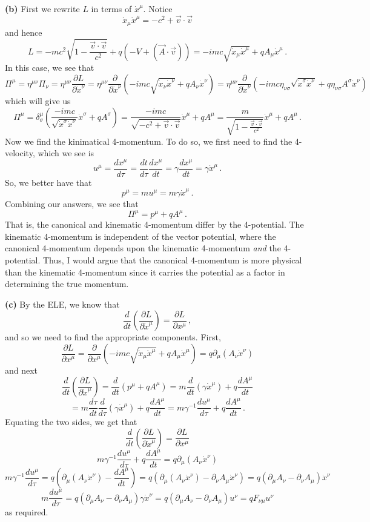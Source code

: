 \documentclass[10pt]{article}
\newcommand{\di}[2][]{\frac{\partial #1}{\partial #2}}
\newcommand{\del}[2][]{\frac{d #1}{d #2}}
\begin{document}
\textbf{(b)} First we rewrite $L$ in terms of $\dot{x}^{\mu}$. Notice
\[ \dot{x}_{\mu}\dot{x}^{\mu} = -c^{2} + \vec{v}\cdot\vec{v} \]
and hence
\[ L = -mc^{2}\sqrt{1 - \frac{\vec{v}\cdot\vec{v}}{c^{2}}} + q(-V + (\vec{A}\cdot\vec{v})) = -imc\sqrt{\dot{x}_{\mu}\dot{x}^{\mu}} + qA_{\mu}\dot{x}^{\mu}\, .\]
In this case, we see that
\[ \Pi^{\mu} = \eta^{\mu\nu}\Pi_{\nu} = \eta^{\mu\nu}\di[L]{\dot{x}^{\nu}} = \eta^{\mu\nu}\di{\dot{x}^{\nu}}\left(-imc\sqrt{\dot{x}_{\nu}\dot{x}^{\nu}} + qA_{\nu}\dot{x}^{\nu}\right) = \eta^{\mu\nu}\di{\dot{x}^{\nu}}\left(-imc\eta_{\nu\sigma}\sqrt{\dot{x}^{\sigma}\dot{x}^{\nu}} + q\eta_{\nu\sigma}A^{\sigma}\dot{x}^{\nu}\right) \]
which will give us
\[ \Pi^{\mu} = \delta^{\mu}_{\sigma}\left(\frac{-imc}{\sqrt{\dot{x}^{\sigma}\dot{x}^{\nu}}}\dot{x}^{\sigma} + qA^{\sigma}\right) = \frac{-imc}{\sqrt{-c^{2} + \vec{v}\cdot\vec{v}}}\dot{x}^{\mu} + qA^{\mu} = \frac{m}{\sqrt{1 - \frac{\vec{v}\cdot\vec{v}}{c^{2}}}}\dot{x}^{\mu} + qA^{\mu}\, .\]
Now we find the kinimatical 4-momentum. To do so, we first need to find the 4-velocity, which we see is
\[ u^{\mu} = \del[x^{\mu}]{\tau} = \del[t]{\tau}\del[x^{\mu}]{t} = \gamma\del[x^{\mu}]{t}= \gamma\dot{x}^{\mu} \, .\]
So, we better have that
\[ p^{\mu} = mu^{\mu} = m\gamma\dot{x}^{\mu} \, .\]
Combining our answers, we see that
\[ \Pi^{\mu} = p^{\mu} + qA^{\mu} \, .\]
That is, the canonical and kinematic 4-momentum differ by the 4-potential. The kinematic 4-momentum is independent of the vector potential, where the canonical 4-momentum depends upon the kinematic 4-momentum \textit{and} the 4-potential. Thus, I would argue that the canonical 4-momentum is more physical than the kinematic 4-momentum since it carries the potential as a factor in determining the true momentum.

\textbf{(c)} By the ELE, we know that
\[ \del{t}\left(\di[L]{\dot{x}^{\mu}}\right) = \di[L]{x^{\mu}} \,,\]
and so we need to find the appropriate components. First,
\[ \di[L]{x^{\mu}} = \di{x^{\mu}}\left(-imc\sqrt{\dot{x}_{\mu}\dot{x}^{\mu}} + qA_{\mu}\dot{x}^{\mu}\right) = q\partial_{\mu}(A_{\nu}\dot{x}^{\nu})\]
and next
\[ \del{t}\left(\di[L]{\dot{x}^{\mu}}\right) = \del{t}\left( p^{\mu} + qA^{\mu}\right) = m\del{t}\left(\gamma \dot{x}^{\mu}\right) + q\del[A^{\mu}]{t} \]
\[ = m\del[\tau]{t}\del{\tau}(\gamma \dot{x}^{\mu}) + q\del[A^{\mu}]{t} = m\gamma^{-1}\del[u^{\mu}]{\tau} + q\del[A^{\mu}]{t} \, .\]
Equating the two sides, we get that
\[ \del{t}\left(\di[L]{\dot{x}^{\mu}}\right) = \di[L]{x^{\mu}}\]
\[ m\gamma^{-1}\del[u^{\mu}]{\tau} + q\del[A^{\mu}]{t} = q\partial_{\mu}(A_{\nu}\dot{x}^{\nu}) \]
\[ m\gamma^{-1}\del[u^{\mu}]{\tau} = q\left(\partial_{\mu}(A_{\nu}\dot{x}^{\nu}) - \del[A^{\mu}]{t}\right) = q\left(\partial_{\mu}(A_{\nu}\dot{x}^{\nu}) - \partial_{\nu}A_{\mu}\dot{x}^{\nu}\right) = q\left(\partial_{\mu}A_{\nu} - \partial_{\nu}A_{\mu}\right)\dot{x}^{\nu}\]
\[ m\del[u^{\mu}]{\tau} = q\left(\partial_{\mu}A_{\nu} - \partial_{\nu}A_{\mu}\right)\gamma\dot{x}^{\nu} = q\left(\partial_{\mu}A_{\nu} - \partial_{\nu}A_{\mu}\right)u^{\nu} = qF_{\nu\mu}u^{\nu} \]
as required.
\end{document}
